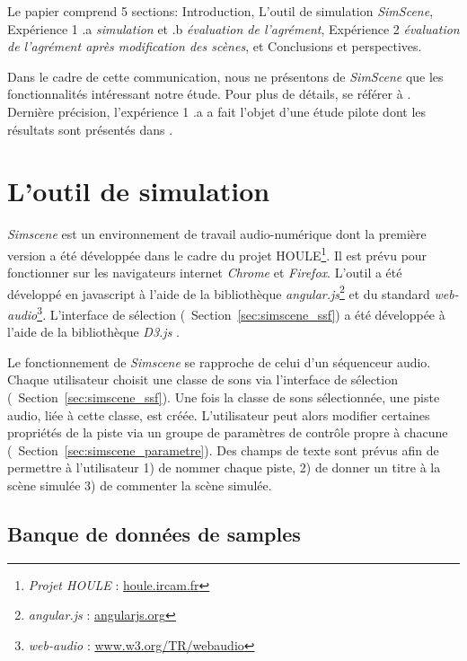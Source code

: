 \documentclass[twoside,twocolumn]{article}
\begin{document}
Le papier comprend 5 sections: Introduction, L'outil de simulation \emph{SimScene}, Expérience 1 .a \emph{simulation} et .b \emph{évaluation de l'agrément}, Expérience 2 \emph{évaluation de l'agrément après modification des scènes}, et Conclusions et perspectives. 

Dans le cadre de cette communication, nous ne présentons de \emph{SimScene} que les fonctionnalités intéressant notre étude. Pour plus de détails, se référer à \cite{rossignol2015simscene,lafay2016JAES}. Dernière précision, l'expérience 1 .a a fait l'objet d'une étude pilote dont les résultats sont présentés dans \cite{lafay2013atiam,lafay2014new}.



\section{L'outil de simulation}
\label{sec:simscene}

\emph{Simscene} est un environnement de travail audio-numérique dont la première version a été développée dans le cadre du projet HOULE\footnote{\emph{Projet HOULE} : \url{houle.ircam.fr}}. Il est prévu pour fonctionner sur les navigateurs internet \emph{Chrome} et \emph{Firefox}. L'outil a été développé en javascript à l'aide de la bibliothèque \emph{angular.js}\footnote{\emph{angular.js} : \url{angularjs.org}} et du standard \emph{web-audio}\footnote{\emph{web-audio} : \url{www.w3.org/TR/webaudio}}. L'interface de sélection (\cf~Section~\ref{sec:simscene_ssf}) a été développée à l'aide de la bibliothèque \emph{D3.js} \cite{d32011}.

Le fonctionnement de \emph{Simscene} se rapproche de celui d'un séquenceur audio. Chaque utilisateur choisit une classe de sons via l'interface de sélection (\cf~Section~\ref{sec:simscene_ssf}). Une fois la classe de sons sélectionnée, une piste audio, liée à cette classe, est créée. L'utilisateur peut alors modifier certaines propriétés de la piste via un groupe de paramètres de contrôle propre à chacune (\cf~Section~\ref{sec:simscene_parametre}). Des champs de texte sont prévus afin de permettre à l'utilisateur 1) de nommer chaque piste, 2) de donner un titre à la scène simulée 3) de commenter la scène simulée.

\subsection{Banque de données de samples}
\label{sec:simscene_sampleDataSet}
\end{document}
